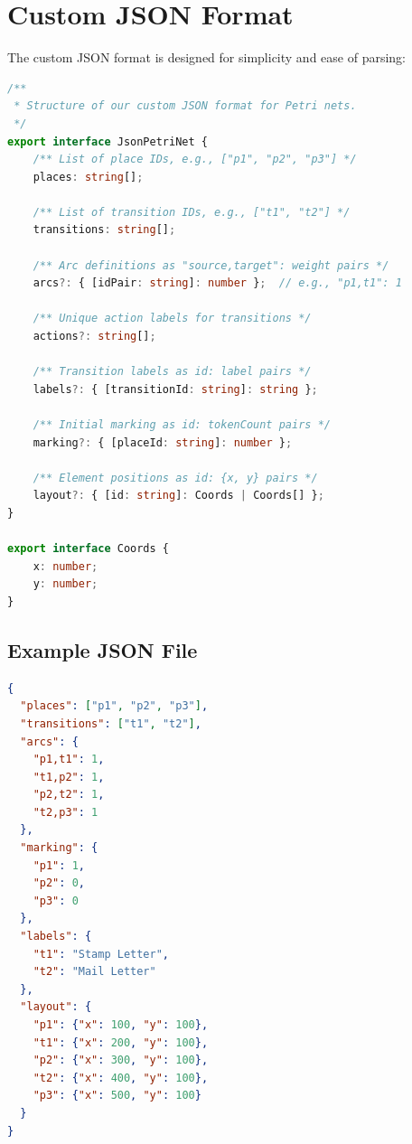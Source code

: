 \section{Custom JSON Format}
\label{sec:json-format}

The custom JSON format is designed for simplicity and ease of parsing:

\begin{lstlisting}[language=TypeScript, caption={JSON format interface (src/app/classes/json-petri-net.ts)}]
/**
 * Structure of our custom JSON format for Petri nets.
 */
export interface JsonPetriNet {
    /** List of place IDs, e.g., ["p1", "p2", "p3"] */
    places: string[];
    
    /** List of transition IDs, e.g., ["t1", "t2"] */
    transitions: string[];
    
    /** Arc definitions as "source,target": weight pairs */
    arcs?: { [idPair: string]: number };  // e.g., "p1,t1": 1
    
    /** Unique action labels for transitions */
    actions?: string[];
    
    /** Transition labels as id: label pairs */
    labels?: { [transitionId: string]: string };
    
    /** Initial marking as id: tokenCount pairs */
    marking?: { [placeId: string]: number };
    
    /** Element positions as id: {x, y} pairs */
    layout?: { [id: string]: Coords | Coords[] };
}

export interface Coords {
    x: number;
    y: number;
}
\end{lstlisting}

\subsection{Example JSON File}

\begin{lstlisting}[language=json, caption={Example Petri net in JSON format}]
{
  "places": ["p1", "p2", "p3"],
  "transitions": ["t1", "t2"],
  "arcs": {
    "p1,t1": 1,
    "t1,p2": 1,
    "p2,t2": 1,
    "t2,p3": 1
  },
  "marking": {
    "p1": 1,
    "p2": 0,
    "p3": 0
  },
  "labels": {
    "t1": "Stamp Letter",
    "t2": "Mail Letter"
  },
  "layout": {
    "p1": {"x": 100, "y": 100},
    "t1": {"x": 200, "y": 100},
    "p2": {"x": 300, "y": 100},
    "t2": {"x": 400, "y": 100},
    "p3": {"x": 500, "y": 100}
  }
}
\end{lstlisting}

